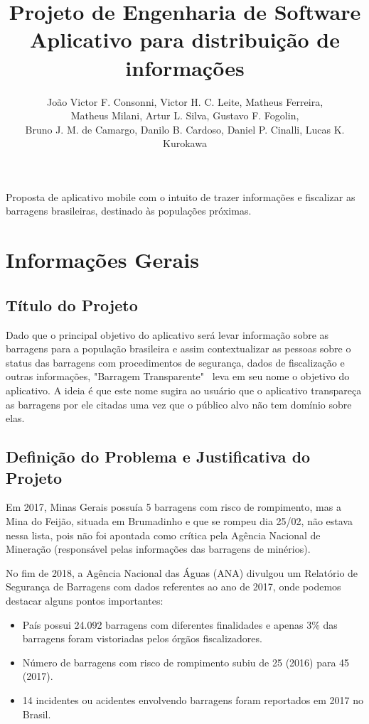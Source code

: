 \documentclass[12pt]{article}
\title{Projeto de Engenharia de Software\\ Aplicativo para distribuição de informações}
\author{João Victor F. Consonni\inst{1}, Victor H. C. Leite\inst{1}, Matheus Ferreira\inst{1}, \\Matheus Milani\inst{1}, Artur L. Silva\inst{1}, Gustavo F. Fogolin\inst{1}, \\Bruno J. M. de Camargo\inst{1}, Danilo B. Cardoso\inst{1}, Daniel P. Cinalli\inst{1}, Lucas K. Kurokawa\inst{1}}
\begin{document}
 

\maketitle

\begin{resumo} 
  Proposta de aplicativo mobile com o intuito de trazer informações e fiscalizar as barragens brasileiras, destinado às populações próximas. 
\end{resumo}


\section{Informações Gerais}
\subsection{Título do Projeto}

Dado que o principal objetivo do aplicativo será levar informação sobre as barragens para a população brasileira e assim contextualizar as pessoas sobre o status das barragens com procedimentos de segurança, dados de fiscalização e outras informações, "Barragem Transparente" \ leva em seu nome o objetivo do aplicativo. A ideia é que este nome sugira ao usuário que o aplicativo transpareça as barragens por ele citadas uma vez que o público alvo não tem domínio sobre elas.

\subsection{Definição do Problema e Justificativa do Projeto}
Em 2017, Minas Gerais possuía 5 barragens com risco de rompimento, mas a Mina do Feijão, situada em Brumadinho e que se rompeu dia 25/02, não estava nessa lista, pois não foi apontada como crítica pela Agência Nacional de Mineração (responsável pelas informações das barragens de minérios).

No fim de 2018, a Agência Nacional das Águas (ANA) divulgou um Relatório de Segurança de Barragens com dados referentes ao ano de 2017, onde podemos destacar alguns pontos importantes:

\begin{itemize}
    \item País possui 24.092 barragens com diferentes finalidades e apenas 3\% das barragens foram vistoriadas pelos órgãos fiscalizadores.
    
    \item Número de barragens com risco de rompimento subiu de 25 (2016) para 45 (2017).
    
    \item 14 incidentes ou acidentes envolvendo barragens foram reportados em 2017 no Brasil.
\end{itemize}
\end{document}
